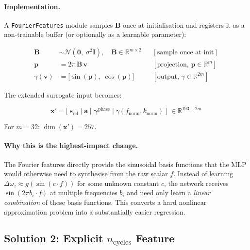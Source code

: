 \documentclass[11pt]{article}
\newcommand{\vect}[1]{\mathbf{#1}}
\newcommand{\mat}[1]{\mathbf{#1}}
\newcommand{\Real}{\mathbb{R}}
\begin{document}
\paragraph{Implementation.}
A \texttt{FourierFeatures} module samples $\mat{B}$ once at initialisation
and registers it as a non-trainable buffer (or optionally as a learnable parameter):

\begin{equation}
  \boxed{\;
  \begin{aligned}
    \mat{B} &\sim \mathcal{N}(\vect{0},\; \sigma^2 \mat{I}),
      \quad \mat{B} \in \Real^{m \times 2}
      && [\text{sample once at init}] \\[4pt]
    \vect{p} &= 2\pi\, \mat{B}\, \vect{v}
      && [\text{projection, } \vect{p} \in \Real^m] \\[4pt]
    \gamma(\vect{v}) &= \bigl[\sin(\vect{p}),\; \cos(\vect{p})\bigr]
      && [\text{output, } \gamma \in \Real^{2m}]
  \end{aligned}
  \;}
  \label{eq:rff-impl}
\end{equation}

\noindent
The extended surrogate input becomes:

\begin{equation}
  \vect{x}' = \bigl[\;
    \vect{s}_{\mathrm{rel}}
    \;\big|\;
    \vect{a}
    \;\big|\;
    \vect{\gamma}^{\mathrm{phase}}
    \;\big|\;
    \gamma(f_{\mathrm{norm}}, k_{\mathrm{norm}})
  \;\bigr]
  \;\in \Real^{193 + 2m}
  \label{eq:extended-input}
\end{equation}

\noindent
For $m = 32$: $\dim(\vect{x}') = 257$.

\paragraph{Why this is the highest-impact change.}
The Fourier features directly provide the sinusoidal basis functions that the
MLP would otherwise need to synthesise from the raw scalar $f$.
Instead of learning $\Delta\omega_z \approx g(\sin(c \cdot f))$ for some
unknown constant $c$, the network receives $\sin(2\pi b_i \cdot f)$ at
multiple frequencies $b_i$ and need only learn a \emph{linear combination}
of these basis functions.
This converts a hard nonlinear approximation problem into a substantially
easier regression.

\subsection{Solution 2: Explicit $n_{\mathrm{cycles}}$ Feature}
\label{sec:ncycles}
\end{document}
